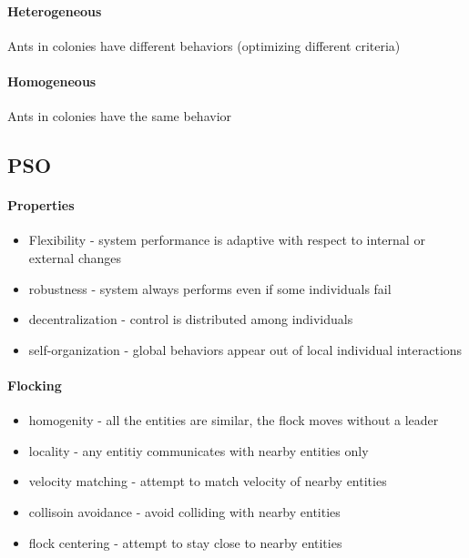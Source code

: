 \documentclass[12pt]{article}
\begin{document}
\paragraph{Heterogeneous} 
\label{par:heterogeneous}
Ants in colonies have different behaviors (optimizing different criteria)

\paragraph{Homogeneous} 
\label{par:homogeneous}
Ants in colonies have the same behavior

\subsection*{PSO}
\label{sub:pso}
\paragraph{Properties} 
\label{par:properties}
\begin{itemize}
	\item Flexibility - system performance is adaptive with respect to internal or external changes
	\item robustness - system always performs even if some individuals fail
	\item decentralization - control is distributed among individuals
	\item self-organization - global behaviors appear out of local individual interactions
\end{itemize}

\paragraph{Flocking} 
\label{par:flocking}
\begin{itemize}
	\item homogenity - all the entities are similar, the flock moves without a leader
	\item locality - any entitiy communicates with nearby entities only
	\item velocity matching - attempt to match velocity of nearby entities
	\item collisoin avoidance - avoid colliding with nearby entities
	\item flock centering - attempt to stay close to nearby entities
\end{itemize}
\end{document}
